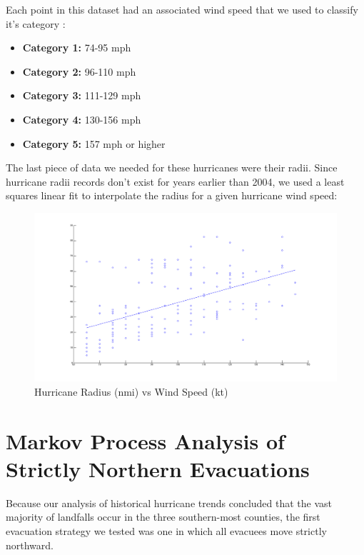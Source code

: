\documentclass[titlepage]{article}
\begin{document}
    \newpage
  Each point in this dataset had an associated wind speed that we used to classify it's category \cite{categories}:
  \begin{itemize}
    \item[]
      \textbf{Category 1:} 74-95 mph
    \item[]
      \textbf{Category 2:} 96-110 mph
    \item[]
      \textbf{Category 3:} 111-129 mph
    \item[]
      \textbf{Category 4:} 130-156 mph
    \item[]
      \textbf{Category 5:} 157 mph or higher
  \end{itemize}
  The last piece of data we needed for these hurricanes were their radii. Since hurricane radii records don't exist for years earlier than 2004, we used a least squares linear fit to interpolate the radius for a given hurricane wind speed:
  \begin{figure}[H]
    \centering
    \includegraphics[width=\textwidth]{figures/least_fit.png}
    \caption{Hurricane Radius (nmi) vs Wind Speed (kt)}
    \label{fig:highway_map}
  \end{figure}


\section{Markov Process Analysis of Strictly Northern Evacuations}
\label{sec:markov}
  Because our analysis of historical hurricane trends concluded that the vast majority of landfalls occur in the three southern-most counties, the first evacuation strategy we tested was one in which all evacuees move strictly northward.
\end{document}
